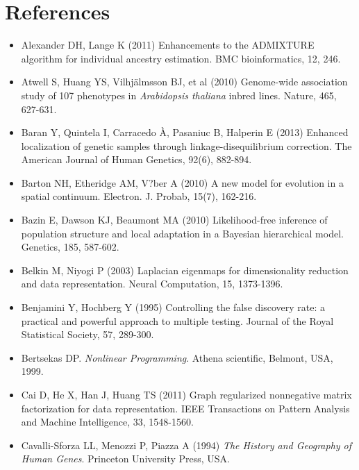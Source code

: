 \clearpage
\newpage


\section*{References}

\begin{itemize}


\item[] Alexander DH, Lange K (2011) Enhancements to the ADMIXTURE algorithm for individual ancestry estimation. BMC bioinformatics, 12, 246.

\item[] Atwell S, Huang YS, Vilhj\"almsson BJ, et al (2010) Genome-wide association study of 107 phenotypes in {\it Arabidopsis thaliana} inbred lines. Nature, 465, 627-631.

\item[] Baran Y, Quintela I, Carracedo \`A, Pasaniuc B, Halperin E (2013) Enhanced localization of genetic samples through linkage-disequilibrium correction. The American Journal of Human Genetics, 92(6), 882-894.

\item[] Barton NH, Etheridge AM,  V?ber A (2010) A new model for evolution in a spatial continuum. Electron. J. Probab, 15(7), 162-216.

\item[] Bazin E, Dawson KJ, Beaumont MA (2010) Likelihood-free inference of population structure and local adaptation in a Bayesian hierarchical model. Genetics, 185, 587-602.

\item[] Belkin M, Niyogi P (2003) Laplacian eigenmaps for dimensionality reduction and data representation. Neural Computation, 15, 1373-1396.

\item[] Benjamini Y, Hochberg Y (1995) Controlling the false discovery rate: a practical and powerful approach to multiple testing. Journal of the Royal Statistical Society, 57, 289-300.

\item[] Bertsekas DP. {\it Nonlinear Programming}. Athena scientific, Belmont, USA, 1999.

\item[] Cai D, He X, Han J, Huang TS (2011) Graph regularized nonnegative matrix factorization for data representation. IEEE Transactions on Pattern Analysis and Machine Intelligence, 33, 1548-1560.

\item[] Cavalli-Sforza LL, Menozzi P, Piazza A (1994) {\it The History and Geography of Human Genes}. Princeton University Press, USA.


\end{itemize}

